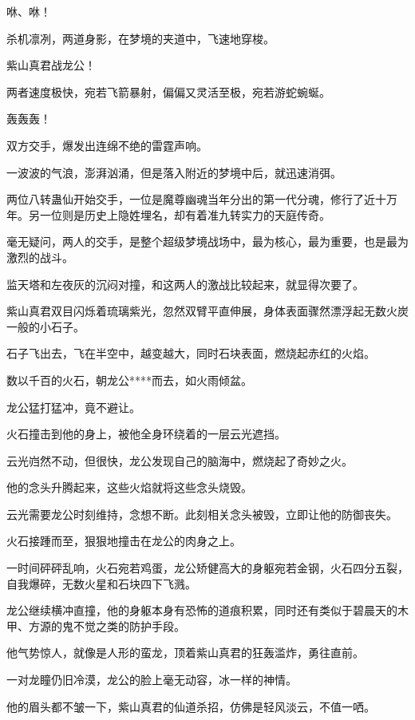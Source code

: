 
\begin{this_body}

咻、咻！

杀机凛冽，两道身影，在梦境的夹道中，飞速地穿梭。

紫山真君战龙公！

两者速度极快，宛若飞箭暴射，偏偏又灵活至极，宛若游蛇蜿蜒。

轰轰轰！

双方交手，爆发出连绵不绝的雷霆声响。

一波波的气浪，澎湃汹涌，但是落入附近的梦境中后，就迅速消弭。

两位八转蛊仙开始交手，一位是魔尊幽魂当年分出的第一代分魂，修行了近十万年。另一位则是历史上隐姓埋名，却有着准九转实力的天庭传奇。

毫无疑问，两人的交手，是整个超级梦境战场中，最为核心，最为重要，也是最为激烈的战斗。

监天塔和左夜灰的沉闷对撞，和这两人的激战比较起来，就显得次要了。

紫山真君双目闪烁着琉璃紫光，忽然双臂平直伸展，身体表面骤然漂浮起无数火炭一般的小石子。

石子飞出去，飞在半空中，越变越大，同时石块表面，燃烧起赤红的火焰。

数以千百的火石，朝龙公****而去，如火雨倾盆。

龙公猛打猛冲，竟不避让。

火石撞击到他的身上，被他全身环绕着的一层云光遮挡。

云光岿然不动，但很快，龙公发现自己的脑海中，燃烧起了奇妙之火。

他的念头升腾起来，这些火焰就将这些念头烧毁。

云光需要龙公时刻维持，念想不断。此刻相关念头被毁，立即让他的防御丧失。

火石接踵而至，狠狠地撞击在龙公的肉身之上。

一时间砰砰乱响，火石宛若鸡蛋，龙公矫健高大的身躯宛若金钢，火石四分五裂，自我爆碎，无数火星和石块四下飞溅。

龙公继续横冲直撞，他的身躯本身有恐怖的道痕积累，同时还有类似于碧晨天的木甲、方源的鬼不觉之类的防护手段。

他气势惊人，就像是人形的蛮龙，顶着紫山真君的狂轰滥炸，勇往直前。

一对龙瞳仍旧冷漠，龙公的脸上毫无动容，冰一样的神情。

他的眉头都不皱一下，紫山真君的仙道杀招，仿佛是轻风淡云，不值一哂。


\end{this_body}
